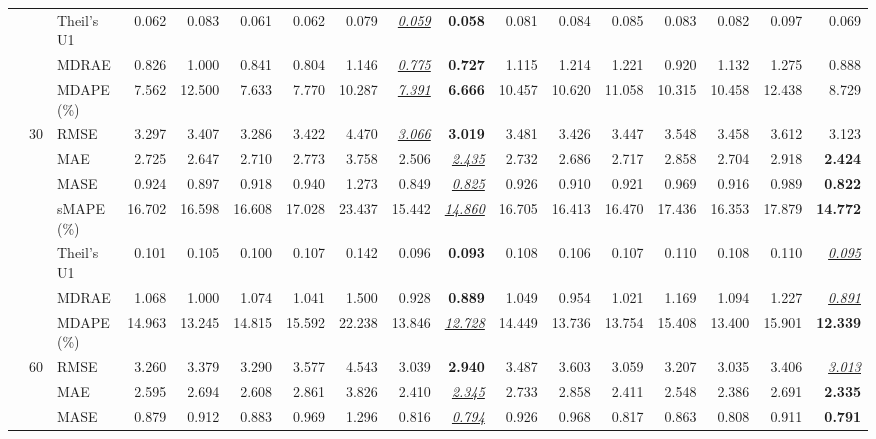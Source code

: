 \begin{table}[!htbp]
{\begin{tabular}{lllrrrrrrrrrrrrrr}
 &  & Theil's U1 & 0.062 & 0.083 & 0.061 & 0.062 & 0.079 & \underline{\textit{0.059}} & \textbf{0.058} & 0.081 & 0.084 & 0.085 & 0.083 & 0.082 & 0.097 & 0.069 \\
 &  & MDRAE & 0.826 & 1.000 & 0.841 & 0.804 & 1.146 & \underline{\textit{0.775}} & \textbf{0.727} & 1.115 & 1.214 & 1.221 & 0.920 & 1.132 & 1.275 & 0.888 \\
 &  & MDAPE (\%) & 7.562 & 12.500 & 7.633 & 7.770 & 10.287 & \underline{\textit{7.391}} & \textbf{6.666} & 10.457 & 10.620 & 11.058 & 10.315 & 10.458 & 12.438 & 8.729 \\
\cmidrule(lr){2-17}
 & 30 & RMSE & 3.297 & 3.407 & 3.286 & 3.422 & 4.470 & \underline{\textit{3.066}} & \textbf{3.019} & 3.481 & 3.426 & 3.447 & 3.548 & 3.458 & 3.612 & 3.123 \\
 &  & MAE & 2.725 & 2.647 & 2.710 & 2.773 & 3.758 & 2.506 & \underline{\textit{2.435}} & 2.732 & 2.686 & 2.717 & 2.858 & 2.704 & 2.918 & \textbf{2.424} \\
 &  & MASE & 0.924 & 0.897 & 0.918 & 0.940 & 1.273 & 0.849 & \underline{\textit{0.825}} & 0.926 & 0.910 & 0.921 & 0.969 & 0.916 & 0.989 & \textbf{0.822} \\
 &  & sMAPE (\%) & 16.702 & 16.598 & 16.608 & 17.028 & 23.437 & 15.442 & \underline{\textit{14.860}} & 16.705 & 16.413 & 16.470 & 17.436 & 16.353 & 17.879 & \textbf{14.772} \\
 &  & Theil's U1 & 0.101 & 0.105 & 0.100 & 0.107 & 0.142 & 0.096 & \textbf{0.093} & 0.108 & 0.106 & 0.107 & 0.110 & 0.108 & 0.110 & \underline{\textit{0.095}} \\
 &  & MDRAE & 1.068 & 1.000 & 1.074 & 1.041 & 1.500 & 0.928 & \textbf{0.889} & 1.049 & 0.954 & 1.021 & 1.169 & 1.094 & 1.227 & \underline{\textit{0.891}} \\
 &  & MDAPE (\%) & 14.963 & 13.245 & 14.815 & 15.592 & 22.238 & 13.846 & \underline{\textit{12.728}} & 14.449 & 13.736 & 13.754 & 15.408 & 13.400 & 15.901 & \textbf{12.339} \\
\cmidrule(lr){2-17}
 & 60 & RMSE & 3.260 & 3.379 & 3.290 & 3.577 & 4.543 & 3.039 & \textbf{2.940} & 3.487 & 3.603 & 3.059 & 3.207 & 3.035 & 3.406 & \underline{\textit{3.013}} \\
 &  & MAE & 2.595 & 2.694 & 2.608 & 2.861 & 3.826 & 2.410 & \underline{\textit{2.345}} & 2.733 & 2.858 & 2.411 & 2.548 & 2.386 & 2.691 & \textbf{2.335} \\
 &  & MASE & 0.879 & 0.912 & 0.883 & 0.969 & 1.296 & 0.816 & \underline{\textit{0.794}} & 0.926 & 0.968 & 0.817 & 0.863 & 0.808 & 0.911 & \textbf{0.791} \\

\end{tabular}}
\end{table}
